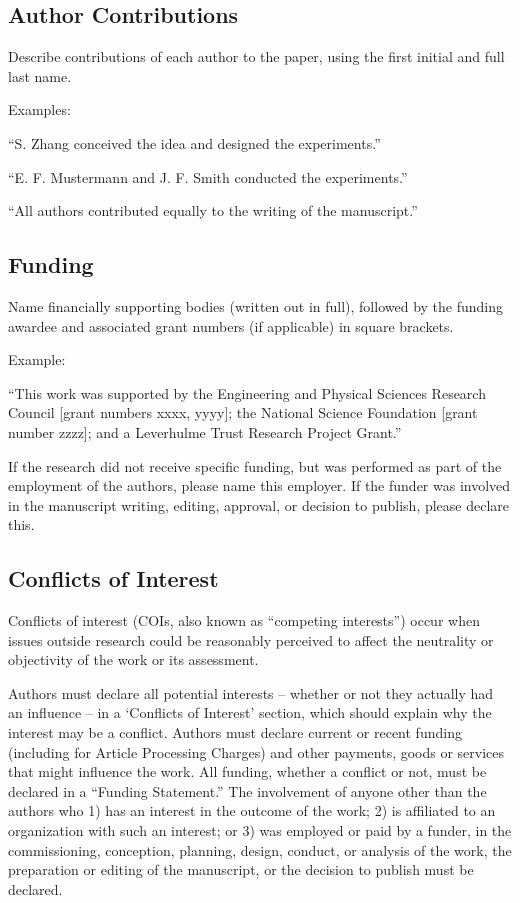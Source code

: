 \documentclass{article}
\begin{document}
\subsection*{Author Contributions} 
Describe contributions of each author to the paper, using the first initial and full last name. 

\medskip Examples:

``S. Zhang conceived the idea and designed the experiments.''

``E. F. Mustermann and J. F. Smith conducted the experiments.''

``All authors contributed equally to the writing of the manuscript.''

\subsection*{Funding}
Name financially supporting bodies (written out in full), followed by the funding awardee and associated grant numbers (if applicable) in square brackets. 

\medskip Example: 

``This work was supported by the Engineering and Physical Sciences Research Council [grant numbers xxxx, yyyy]; the National Science Foundation [grant number zzzz]; and a Leverhulme Trust Research Project Grant.'' 

\medskip
If the research did not receive specific funding, but was performed as part of the employment of the authors, please name this employer. If the funder was involved in the manuscript writing, editing, approval, or decision to publish, please declare this.

\subsection*{Conflicts of Interest}
Conflicts of interest (COIs, also known as ``competing interests'') occur when issues outside research could be reasonably perceived to affect the neutrality or objectivity of the work or its assessment. 

Authors must declare all potential interests – whether or not they actually had an influence – in a ‘Conflicts of Interest’ section, which should explain why the interest may be a conflict. Authors must declare current or recent funding (including for Article Processing Charges) and other payments, goods or services that might influence the work. All funding, whether a conflict or not, must be declared in a ``Funding Statement.'' The involvement of anyone other than the authors who 1) has an interest in the outcome of the work; 2) is affiliated to an organization with such an interest; or 3) was employed or paid by a funder, in the commissioning, conception, planning, design, conduct, or analysis of the work, the preparation or editing of the manuscript, or the decision to publish must be declared.
\end{document}
